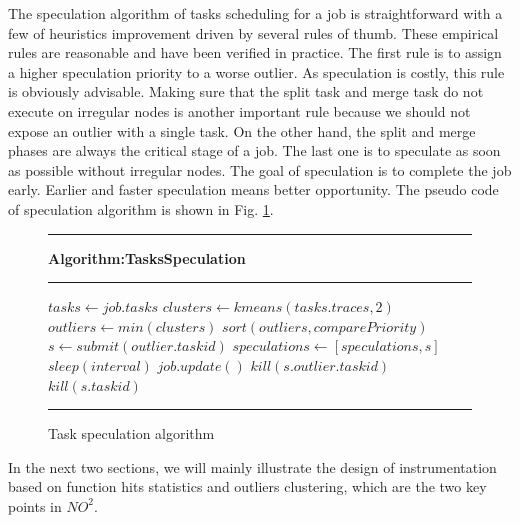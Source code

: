 The speculation algorithm of tasks scheduling for a job is straightforward with a few of
heuristics improvement driven by several rules of thumb. These empirical rules are
reasonable and have been verified in practice. The first rule is to assign a higher speculation
priority to a worse outlier. As speculation is costly, this rule is obviously advisable. Making
sure that the split task and merge task do not execute on irregular nodes is another
important rule because we should not expose an outlier with a single task. On the
other hand, the split and merge phases are always the critical stage of a job. The last
one is to speculate as soon as possible without irregular nodes. The goal of speculation
is to complete the job early. Earlier and faster speculation means better opportunity. The
pseudo code of speculation algorithm is shown in Fig. \ref{fig-spec-algo}.

\begin{figure}
\rule[-.2pt]{0.9\columnwidth}{0.9pt}
\textbf{Algorithm:TasksSpeculation}
\rule[-.2pt]{0.9\columnwidth}{0.5pt}

\begin{algorithmic}[1]

    \State $tasks\gets job.tasks$
    \State $clusters\gets kmeans(tasks.traces, 2)$
        \State $outliers\gets min(clusters)$
        \State $sort(outliers, comparePriority)$
            \State $s\gets submit(outlier.taskid)$
            \State $speculations\gets [speculations, s]$
        \EndFor
    \EndIf
    \State $sleep(interval)$
    \State $job.update()$
            \State $kill(s.outlier.taskid)$
            \State $kill(s.taskid)$
        \EndIf
    \EndFor
\EndWhile\label{specendwhile}
\end{algorithmic}
\rule[-.2pt]{0.9\columnwidth}{0.8pt}
\caption{Task speculation algorithm}\label{fig-spec-algo}
\end{figure}

In the next two sections, we will mainly illustrate the design of instrumentation based on
function hits statistics and outliers clustering, which are the two key points in $NO^2$. 